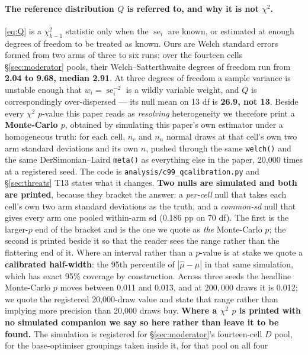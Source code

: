 \documentclass[10pt,letterpaper]{article}
\newcommand{\Dstat}{D}                         %
\DeclareMathOperator{\se}{se}
\begin{document}
\paragraph{The reference distribution $Q$ is referred to, and why it is not $\chi^2$.}
\eqref{eq:Q} is a $\chi^2_{k-1}$ statistic only when the $\se_i$ are known, or estimated at
enough degrees of freedom to be treated as known. Ours are Welch standard errors formed from two
arms of three to six runs: over the fourteen cells \S\ref{sec:moderator} pools, their
Welch--Satterthwaite degrees of freedom run from \textbf{2.04 to 9.68, median 2.91}. At three
degrees of freedom a sample variance is unstable enough that $w_i = \se_i^{-2}$ is a wildly
variable weight, and $Q$ is correspondingly over-dispersed --- its null mean on 13 df is
\textbf{26.9, not 13}. Beside every $\chi^2$ $p$-value this paper reads as
\emph{resolving} heterogeneity we therefore print a
\textbf{Monte-Carlo $p$}, obtained by simulating this paper's own estimator under a homogeneous
truth: for each cell, $n_c$ and $n_n$ normal draws at that cell's own two arm standard deviations
and its own $n$, pushed through the same \texttt{welch()} and the same DerSimonian--Laird
\texttt{meta()} as everything else in the paper, 20{,}000 times at a registered seed. The code
is \texttt{analysis/c99\_qcalibration.py} and \S\ref{sec:threats} T13 states what it changes.
\textbf{Two nulls are simulated and both are printed}, because they bracket the answer: a
\emph{per-cell} null that takes each cell's own two arm standard deviations as the truth, and a
\emph{common-sd} null that gives every arm one pooled within-arm sd (0.186 pp on 70 df). The
first is the larger-$p$ end of the bracket and is the one we quote as \emph{the} Monte-Carlo
$p$; the second is printed beside it so that the reader sees the range rather than the flattering
end of it. Where an interval rather than a $p$-value is at stake we quote a \textbf{calibrated
half-width}: the 95th percentile of $|\hat\mu - \mu|$ in that same simulation, which has exact
95\% coverage by construction. Across three seeds the headline Monte-Carlo $p$ moves between
0.011 and 0.013, and at $200{,}000$ draws it is 0.012; we quote the registered 20{,}000-draw
value and state that range rather than implying more precision than 20{,}000 draws buy.
\textbf{Where a $\chi^2$ $p$ is printed with no simulated companion we say so here rather than
leave it to be found.} The simulation is registered for \S\ref{sec:moderator}'s fourteen-cell
$\Dstat$ pool, for the base-optimiser groupings taken inside it, for that pool on all four
\end{document}
